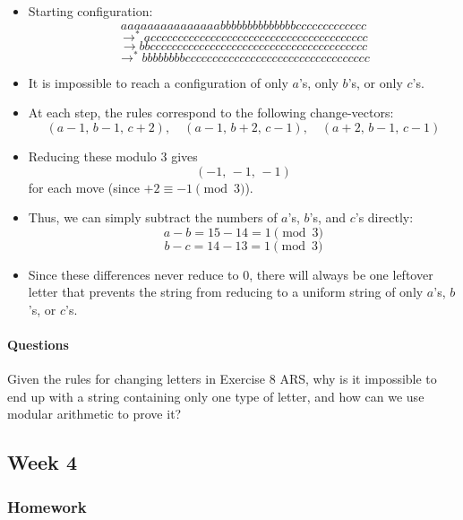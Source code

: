 \documentclass{article}
\theoremstyle{theorem}
\theoremstyle{definition}
\theoremstyle{remark}
\begin{document}
\begin{itemize}
    \item Starting configuration:
    \[
    aaaaaaaaaaaaaaabbbbbbbbbbbbbbccccccccccccc
    \]
    \[
    \to^*
    acccccccccccccccccccccccccccccccccccccccc
    \]
    \[
    \to
    bbcccccccccccccccccccccccccccccccccccccccc
    \]
    \[
    \to^*
    bbbbbbbbcccccccccccccccccccccccccccccccccc
    \]

    \item It is impossible to reach a configuration of only $a$’s, only $b$’s, or only $c$’s.  

    \item At each step, the rules correspond to the following change-vectors:
    \[
    (a-1,\,b-1,\,c+2), \quad
    (a-1,\,b+2,\,c-1), \quad
    (a+2,\,b-1,\,c-1)
    \]

    \item Reducing these modulo $3$ gives
    \[
    (-1,\,-1,\,-1)
    \]
    for each move (since $+2 \equiv -1 \pmod{3}$).  

    \item Thus, we can simply subtract the numbers of $a$’s, $b$’s, and $c$’s directly:
    \[
    a-b = 15 - 14 = 1 \pmod{3}
    \]
    \[
    b-c = 14 - 13 = 1 \pmod{3}
    \]

    \item Since these differences never reduce to $0$, there will always be one leftover letter that prevents the string from reducing to a uniform string of only $a$’s, $b$’s, or $c$’s.
\end{itemize}

\paragraph{Questions}
Given the rules for changing letters in Exercise 8 ARS, why is it impossible to end up with a string containing only one type of letter, and how can we use modular arithmetic to prove it?


\subsection{Week 4}

\subsubsection{Homework}
\end{document}
